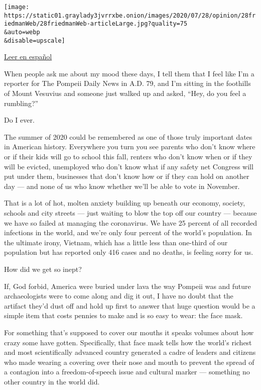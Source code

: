 \texttt{[image: https://static01.graylady3jvrrxbe.onion/images/2020/07/28/opinion/28friedmanWeb/28friedmanWeb-articleLarge.jpg?quality=75\\\&auto=webp\\\&disable=upscale]}

\href{https://www.nytimes3xbfgragh.onion/es/2020/07/30/espanol/opinion/usar-cubrebocas-politica.html}{Leer
en español}

When people ask me about my mood these days, I tell them that I feel
like I'm a reporter for The Pompeii Daily News in A.D. 79, and I'm
sitting in the foothills of Mount Vesuvius and someone just walked up
and asked, ``Hey, do you feel a rumbling?''

Do I ever.

The summer of 2020 could be remembered as one of those truly important
dates in American history. Everywhere you turn you see parents who don't
know where or if their kids will go to school this fall, renters who
don't know when or if they will be evicted, unemployed who don't know
what if any safety net Congress will put under them, businesses that
don't know how or if they can hold on another day --- and none of us who
know whether we'll be able to vote in November.

That is a lot of hot, molten anxiety building up beneath our economy,
society, schools and city streets --- just waiting to blow the top off
our country --- because we have so failed at managing the coronavirus.
We have 25 percent of all recorded infections in the world, and we're
only four percent of the world's population. In the ultimate irony,
Vietnam, which has a little less than one-third of our population but
has reported only 416 cases and no deaths, is feeling sorry for us.

How did we get so inept?

If, God forbid, America were buried under lava the way Pompeii was and
future archaeologists were to come along and dig it out, I have no doubt
that the artifact they'd dust off and hold up first to answer that huge
question would be a simple item that costs pennies to make and is so
easy to wear: the face mask.

For something that's supposed to cover our mouths it speaks volumes
about how crazy some have gotten. Specifically, that face mask tells how
the world's richest and most scientifically advanced country generated a
cadre of leaders and citizens who made wearing a covering over their
nose and mouth to prevent the spread of a contagion into a
freedom-of-speech issue and cultural marker --- something no other
country in the world did.

